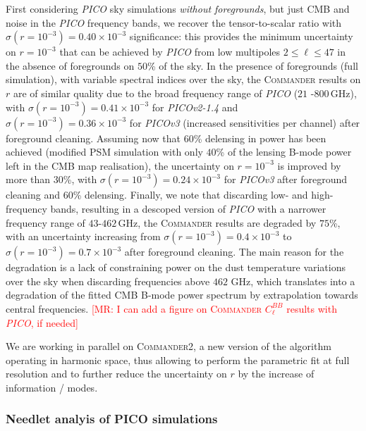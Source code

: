 \documentclass[PICOReport.tex]{subfiles}
\begin{document}
First considering \emph{PICO} sky simulations \emph{without foregrounds}, but just CMB and noise in the \emph{PICO} frequency bands,  we recover the tensor-to-scalar ratio with ${\sigma(r = 10^{-3}) = 0.40 \times 10^{-3}}$ significance: this provides the minimum uncertainty on ${r = 10^{-3}}$ that can be achieved by \emph{PICO} from low multipoles $2 \leq \ell \leq 47$ in the absence of foregrounds on $50$\% of the sky. In the presence of foregrounds (full simulation), with variable spectral indices over the sky, the \textsc{Commander} results on $r$ are of similar quality due to the broad frequency range of \emph{PICO} ($21$ -$800$\,GHz), with ${\sigma(r = 10^{-3}) = 0.41 \times 10^{-3}}$ for \emph{PICOv2-1.4} and ${\sigma(r = 10^{-3}) = 0.36 \times 10^{-3}}$ for \emph{PICOv3} (increased sensitivities per channel) after foreground cleaning. Assuming now that $60$\% delensing in power has been achieved (modified PSM simulation with only $40$\% of the lensing B-mode power left in the CMB map realisation), the uncertainty on ${r=10^{-3}}$ is improved by more than $30$\%, with ${\sigma(r = 10^{-3}) = 0.24 \times 10^{-3}}$ for \emph{PICOv3}  after foreground cleaning and $60$\% delensing. Finally, we note that discarding low- and high-frequency bands, resulting in a descoped version of \emph{PICO} with a narrower frequency range of $43$-$462$\,GHz, the \textsc{Commander} results are degraded by $75$\%, with an uncertainty  increasing from 
${\sigma(r = 10^{-3}) = 0.4 \times 10^{-3}}$  to ${\sigma(r = 10^{-3}) = 0.7 \times 10^{-3}}$ after foreground cleaning. The main reason for the degradation is a lack of constraining power on the dust temperature variations over the sky when discarding frequencies above $462$ GHz, which translates into a degradation of the fitted CMB B-mode power spectrum by extrapolation towards central frequencies. 
\newline\textcolor{red}{[MR: I can add a figure on \textsc{Commander} $C_\ell^{BB}$ results with \emph{PICO}, if needed]}

We are working in parallel on \textsc{Commander2}, a new version of the algorithm operating in harmonic space, thus allowing to perform the parametric fit at full resolution and to further reduce the uncertainty on $r$ by the increase of information / modes.


\subsubsection{Needlet analyis of PICO simulations}
\end{document}
